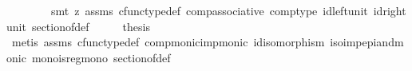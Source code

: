 \begin{isabellebody}
\ \ \ \ \ \ \ \ smt\ {\isacharparenleft}{\kern0pt}z{}{\isacharparenright}{\kern0pt}\ assms\ cfunc{\isacharunderscore}{\kern0pt}type{\isacharunderscore}{\kern0pt}def\ comp{\isacharunderscore}{\kern0pt}associative{}\ comp{\isacharunderscore}{\kern0pt}type\ id{\isacharunderscore}{\kern0pt}left{\isacharunderscore}{\kern0pt}unit\ id{\isacharunderscore}{\kern0pt}right{\isacharunderscore}{\kern0pt}unit{}\ section{\isacharunderscore}{\kern0pt}of{\isacharunderscore}{\kern0pt}def{\isacharparenright}{\kern0pt}\isanewline
\ \ \isamarkupfalse%
\ \isamarkupfalse%
\ {\isacharquery}{\kern0pt}thesis\isanewline
\ \ \ \ \isamarkupfalse%
\ {\isacharparenleft}{\kern0pt}metis\ assms{\isacharparenleft}{\kern0pt}{}{\isacharparenright}{\kern0pt}\ cfunc{\isacharunderscore}{\kern0pt}type{\isacharunderscore}{\kern0pt}def\ comp{\isacharunderscore}{\kern0pt}monic{\isacharunderscore}{\kern0pt}imp{\isacharunderscore}{\kern0pt}monic{\isacharprime}{\kern0pt}\ id{\isacharunderscore}{\kern0pt}isomorphism\ iso{\isacharunderscore}{\kern0pt}imp{\isacharunderscore}{\kern0pt}epi{\isacharunderscore}{\kern0pt}and{\isacharunderscore}{\kern0pt}monic\ mono{\isacharunderscore}{\kern0pt}is{\isacharunderscore}{\kern0pt}regmono\ section{\isacharunderscore}{\kern0pt}of{\isacharunderscore}{\kern0pt}def{\isacharparenright}{\kern0pt}\isanewline
{}\isamarkupfalse%
%
\endisatagproof
{\isafoldproof}%
%
\isadelimproof
\isanewline
%
\endisadelimproof
%
\isadelimtheory
\isanewline
%
\endisadelimtheory
%
\isatagtheory
{}\isamarkupfalse%
%
\endisatagtheory
{\isafoldtheory}%
%
\isadelimtheory
%
\endisadelimtheory
%
\end{isabellebody}%
\endinput
